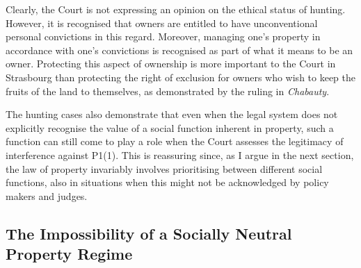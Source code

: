 Clearly, the Court is not expressing an opinion on the ethical status of hunting. However, it is recognised that owners are entitled to have unconventional personal convictions in this regard. Moreover, managing one's property in accordance with one's convictions is recognised as part of what it means to be an owner. Protecting this aspect of ownership is more important to the Court in Strasbourg than protecting the right of exclusion for owners who wish to keep the fruits of the land to themselves, as demonstrated by the ruling in {\it Chabauty}. 

The hunting cases also demonstrate that even when the legal system does not explicitly recognise the value of a social function inherent in property, such a function can still come to play a role when the Court assesses the legitimacy of interference against P1(1). This is reassuring since, as I argue in the next section, the law of property invariably involves prioritising between different social functions, also in situations when this might not be acknowledged by policy makers and judges.

\subsection{The Impossibility of a Socially Neutral Property Regime}\label{sec:2:4:2}

